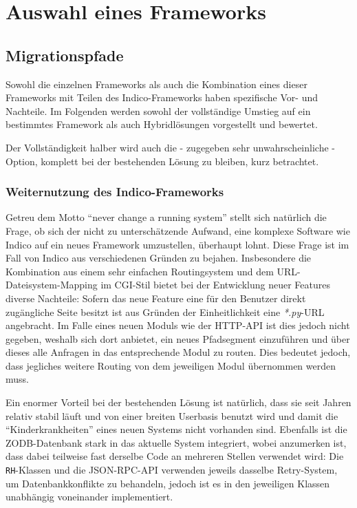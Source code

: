 \chapter{Auswahl eines Frameworks}

\section{Migrationspfade}
Sowohl die einzelnen Frameworks als auch die Kombination eines dieser Frameworks mit Teilen des
Indico-Frameworks haben spezifische Vor- und Nachteile. Im Folgenden werden sowohl der vollständige
Umstieg auf ein bestimmtes Framework als auch Hybridlösungen vorgestellt und bewertet.

Der Vollständigkeit halber wird auch die - zugegeben sehr unwahrscheinliche - Option, komplett bei
der bestehenden Lösung zu bleiben, kurz betrachtet.

\subsection{Weiternutzung des Indico-Frameworks}
Getreu dem Motto \enquote{never change a running system} stellt sich natürlich die Frage, ob sich
der nicht zu unterschätzende Aufwand, eine komplexe Software wie Indico auf ein neues Framework
umzustellen, überhaupt lohnt. Diese Frage ist im Fall von Indico aus verschiedenen Gründen zu
bejahen. Insbesondere die Kombination aus einem sehr einfachen Routingsystem und dem
URL-Dateisystem-Mapping im CGI-Stil bietet bei der Entwicklung neuer Features diverse Nachteile:
Sofern das neue Feature eine für den Benutzer direkt zugängliche Seite besitzt ist aus Gründen der
Einheitlichkeit eine \emph{*.py}-URL angebracht. Im Falle eines neuen Moduls wie der HTTP-API ist
dies jedoch nicht gegeben, weshalb sich dort anbietet, ein neues Pfadsegment einzuführen und über
dieses alle Anfragen in das entsprechende Modul zu routen. Dies bedeutet jedoch, dass jegliches
weitere Routing von dem jeweiligen Modul übernommen werden muss.

Ein enormer Vorteil bei der bestehenden Lösung ist natürlich, dass sie seit Jahren relativ stabil
läuft und von einer breiten Userbasis benutzt wird und damit die \enquote{Kinderkrankheiten} eines
neuen Systems nicht vorhanden sind. Ebenfalls ist die ZODB-Datenbank stark in das
aktuelle System integriert, wobei anzumerken ist, dass dabei teilweise fast derselbe Code an
mehreren Stellen verwendet wird: Die \lstinline{RH}-Klassen und die JSON-RPC-API verwenden jeweils
dasselbe Retry-System, um Datenbankkonflikte zu behandeln, jedoch ist es in den jeweiligen Klassen
unabhängig voneinander implementiert.

